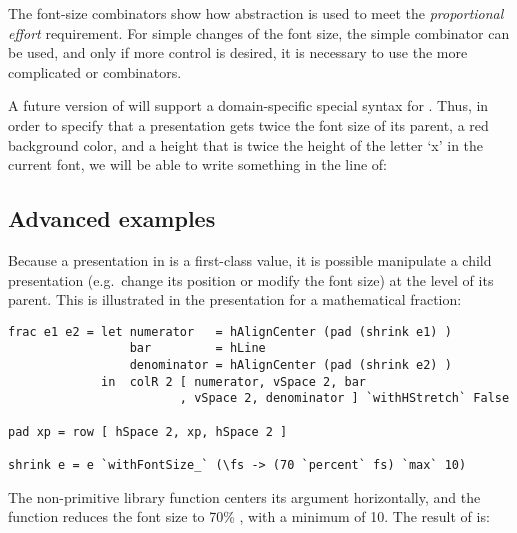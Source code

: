 The font-size combinators show how abstraction is used to meet the {\em proportional effort} requirement. For simple changes of the font size, the simple  combinator can be used, and only if more control is desired, it is necessary to use the more complicated  or  combinators.

A future version of {\Xprez} will support a domain-specific special syntax for . Thus, in order to specify that  a presentation  gets twice the font size of its parent, a red background color, and a height that is twice the height of the letter `x' in the current font, we will be able to write something in the line of: 

\begin{small}
\end{small}

%																
\subsection{Advanced examples} \label{sect:xprezFrac}

Because a presentation in {\Xprez} is a first-class value, it is possible manipulate a child presentation (e.g.\ change its position or modify the font size) at the level of its parent.  This is illustrated in the presentation for a mathematical fraction: 

\begin{small}
\begin{verbatim}
frac e1 e2 = let numerator   = hAlignCenter (pad (shrink e1) )
                 bar         = hLine
                 denominator = hAlignCenter (pad (shrink e2) )
             in  colR 2 [ numerator, vSpace 2, bar
                        , vSpace 2, denominator ] `withHStretch` False

pad xp = row [ hSpace 2, xp, hSpace 2 ]

shrink e = e `withFontSize_` (\fs -> (70 `percent` fs) `max` 10)
\end{verbatim}
\end{small}

The non-primitive library function  centers its argument horizontally, and the  function reduces the font size to 70\%
, with a minimum of 10. The result of  is:

\begin{center}
\end{center}

